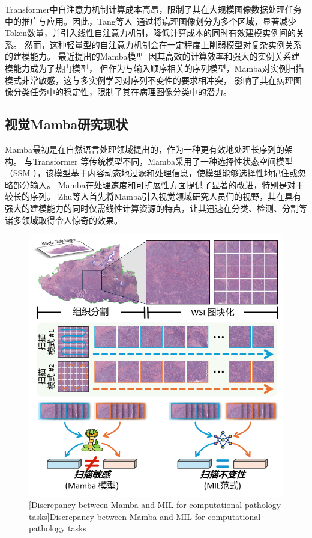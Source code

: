 Transformer中自注意力机制计算成本高昂，限制了其在大规模图像数据处理任务中的推广与应用。因此，Tang等人~\cite{tang2024feature}通过将病理图像划分为多个区域，显著减少Token数量，并引入线性自注意力机制，降低计算成本的同时有效建模实例间的关系。
然而，这种轻量型的自注意力机制会在一定程度上削弱模型对复杂实例关系的建模能力。
最近提出的Mamba模型~\cite{gu2023mamba}因其高效的计算效率和强大的实例关系建模能力成为了热门模型，
但作为与输入顺序相关的序列模型，Mamba对实例扫描模式非常敏感，这与多实例学习对序列不变性的要求相冲突，
影响了其在病理图像分类任务中的稳定性，限制了其在病理图像分类中的潜力。


\subsection[\hspace{-2pt}视觉Mamba研究现状]{{\heiti{} \hspace{-8pt}视觉Mamba研究现状}}\label{section1: 视觉Mamba研究现状}

Mamba最初是在自然语言处理领域提出的，作为一种更有效地处理长序列的架构\cite{gu2023mamba}。
与Transformer \cite{vaswani2017attention}等传统模型不同，Mamba采用了一种选择性状态空间模型（SSM \cite{kalman1960new}），该模型基于内容动态地过滤和处理信息，使模型能够选择性地记住或忽略部分输入。
Mamba在处理速度和可扩展性方面提供了显著的改进，特别是对于较长的序列。
Zhu等人首先将Mamba引入视觉领域研究人员们的视野\cite{zhu2024vision}，其在具有强大的建模能力的同时仅需线性计算资源的特点，让其迅速在分类、检测、分割等诸多领域取得令人惊奇的效果。
\begin{figure}[h]
    \centering
    \includegraphics[width=0.7\columnwidth]{figures/Discrepancy1.png}
    [Discrepancy between Mamba and MIL for computational pathology tasks]{Discrepancy between Mamba and MIL for computational pathology tasks}
    \label{figure1: Mamba模型与MIL任务差异}
\end{figure}

